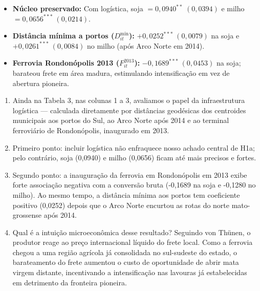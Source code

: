 \documentclass[11pt,a4paper]{article}
\begin{document}
\begin{tcolorbox}[title={\bfseries\small ÂNCORAS EMPÍRICAS E CONCEITUAIS DO SLIDE}]
\begin{itemize}[leftmargin=*,itemsep=1mm,topsep=0.5mm]
    \item \textbf{Núcleo preservado:} Com logística, soja $= 0{,}0940^{**}\;(0{,}0394)$ e milho $= 0{,}0656^{***}\;(0{,}0214)$.
    \item \textbf{Distância mínima a portos ($D_{it}^{\text{min}}$):} $+0{,}0252^{***}\;(0{,}0079)$ na soja e $+0{,}0261^{***}\;(0{,}0084)$ no milho (após Arco Norte em 2014).
    \item \textbf{Ferrovia Rondonópolis 2013 ($F_{it}^{2013}$):} $-0{,}1689^{***}\;(0{,}0453)$ na soja; barateou frete em área madura, estimulando intensificação em vez de abertura pioneira.
\end{itemize}
\end{tcolorbox}
\vspace{2mm}

\vspace{0.8mm}
\begin{enumerate}[leftmargin=*,label=\textbf{(\arabic*)},itemsep=2.8mm,topsep=1mm]
    \item Ainda na Tabela 3, nas colunas 1 a 3, avaliamos o papel da infraestrutura logística — calculada diretamente por distâncias geodésicas dos centroides municipais aos portos do Sul, ao Arco Norte após 2014 e ao terminal ferroviário de Rondonópolis, inaugurado em 2013.
    \item Primeiro ponto: incluir logística não enfraquece nosso achado central de H1a; pelo contrário, soja (0,0940) e milho (0,0656) ficam até mais precisos e fortes.
    \item Segundo ponto: a inauguração da ferrovia em Rondonópolis em 2013 exibe forte associação negativa com a conversão bruta (-0,1689 na soja e -0,1280 no milho). Ao mesmo tempo, a distância mínima aos portos tem coeficiente positivo (0,0252) depois que o Arco Norte encurtou as rotas do norte mato-grossense após 2014.
    \item Qual é a intuição microeconômica desse resultado? Seguindo von Thünen, o produtor reage ao preço internacional líquido do frete local. Como a ferrovia chegou a uma região agrícola já consolidada no sul-sudeste do estado, o barateamento do frete aumentou o custo de oportunidade de abrir mata virgem distante, incentivando a intensificação nas lavouras já estabelecidas em detrimento da fronteira pioneira.
\end{enumerate}
\end{document}
